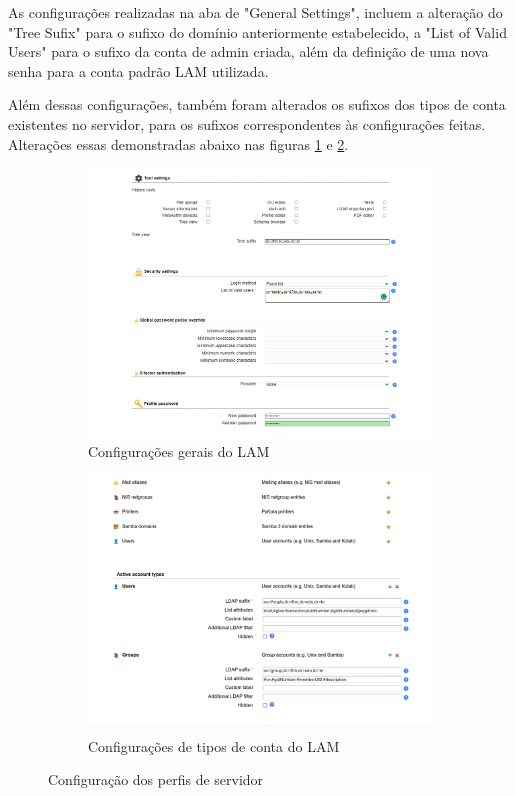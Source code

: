 As configurações realizadas na aba de "General Settings", incluem a alteração do "Tree Sufix" para o sufixo do domínio anteriormente estabelecido, a "List of Valid Users" para o sufixo da conta de admin criada, além da definição de uma nova senha para a conta padrão LAM utilizada. 

Além dessas configurações, também foram alterados os sufixos dos tipos de conta existentes no servidor, para os sufixos correspondentes às configurações feitas. Alterações essas demonstradas abaixo nas figuras \ref{fig:LAM4} e \ref{fig:LAM5}.

\begin{figure}[ht]
    \begin{subfigure}{0.48\textwidth}
    	\centering
    	\includegraphics[width=\linewidth]{textuais/LAM4.png}
    	\caption{Configurações gerais do LAM
    	\label{fig:LAM4}}
    \end{subfigure}%
    \hspace{0.04\textwidth} %
    \begin{subfigure}{0.48\textwidth}
    	\centering
    	\includegraphics[width=\linewidth]{textuais/TiposContaLAM.png}
    	\caption{Configurações de tipos de conta do LAM
    	\label{fig:LAM5}}
    \end{subfigure}
    \caption{Configuração dos perfis de servidor}
    \label{fig:figurasLAM}
\end{figure}

